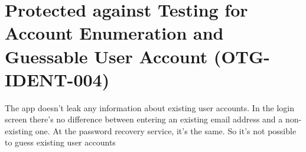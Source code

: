 \chapter{Protected against Testing for Account Enumeration and Guessable User Account (OTG-IDENT-004)}

The app doesn't leak any information about existing user accounts. 
In the login screen there's no difference between entering an existing email address and a non-existing one.
At the password recovery service, it's the same. So it's not possible to guess existing user accounts